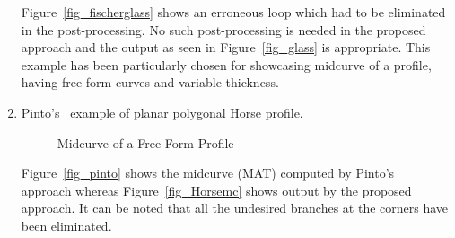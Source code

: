 \begin{enumerate}
Figure~\ref{fig_fischerglass} shows an erroneous loop which had to be eliminated in the post-processing. No such post-processing is needed in the proposed approach and the output as seen in Figure~\ref{fig_glass} is appropriate. This example has been particularly chosen for showcasing midcurve of a profile, having free-form curves and variable thickness.

%
%
%

\item
Pinto's~\cite{Pinto2009} example of planar polygonal Horse profile. 



\begin{figure}[h!]
\centering     %
{} \quad
{} \quad
\caption{Midcurve of a Free Form Profile}
  \label{fig:midsurfcelljoin:Horsemc}
\end{figure}


Figure~\ref{fig_pinto} shows the midcurve (MAT) computed by Pinto's ~\cite{Pinto2009} approach whereas  Figure~\ref{fig_Horsemc} shows output by the proposed approach. It can be noted that all the undesired branches at the corners have been eliminated. %



\end{enumerate}
